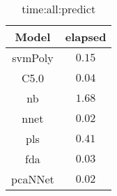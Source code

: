 \begin{table}[!ht]
	\centering
	\begin{tabular}{|c|c|}
		\hline
		Model & elapsed \\ \hline
		svmPoly & $0.15$ \\ \hline
		C5.0 & $0.04$ \\ \hline
		nb & $1.68$ \\ \hline
		nnet & $0.02$ \\ \hline
		pls & $0.41$ \\ \hline
		fda & $0.03$ \\ \hline
		pcaNNet & $0.02$ \\ \hline
	\end{tabular}
	\caption{time:all:predict}
	\label{tab:time:all:predict}
\end{table}
